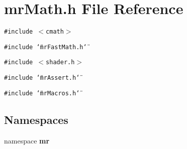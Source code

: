 \section{mr\-Math.h File Reference}
\label{mrMath_8h}
{\tt \#include $<$cmath$>$}\par
{\tt \#include \char`\"{}mr\-Fast\-Math.h\char`\"{}}\par
{\tt \#include $<$shader.h$>$}\par
{\tt \#include \char`\"{}mr\-Assert.h\char`\"{}}\par
{\tt \#include \char`\"{}mr\-Macros.h\char`\"{}}\par
\subsection*{Namespaces}
\begin{CompactItemize}
\item 
namespace {\bf mr}
\end{CompactItemize}
